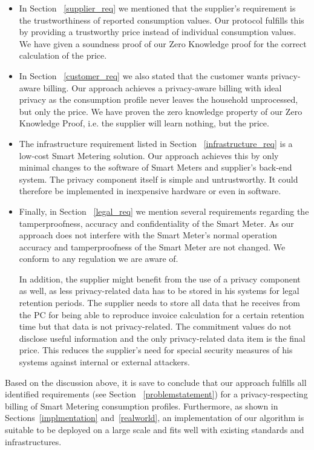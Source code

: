 \documentclass[english]{llncs}
\begin{document}
\begin{itemize}

\item In Section ~\ref{supplier_req} we mentioned that the supplier's requirement is the trustworthiness of reported consumption values.
Our protocol fulfills this by providing a trustworthy price instead of individual consumption values. 
We have given a soundness proof of our Zero Knowledge proof for the correct calculation of the price.

\item In Section ~\ref{customer_req} we also stated that the customer wants privacy-aware billing.
Our approach achieves a privacy-aware billing with ideal privacy as the consumption profile never leaves the household unprocessed, but only the price.
We have proven the zero knowledge property of our Zero Knowledge Proof, i.e. the supplier will learn nothing, but the price.

\item The infrastructure requirement listed in Section ~\ref{infrastructure_req} is a low-cost Smart Metering solution.
Our approach achieves this by only minimal changes to the software of Smart Meters and supplier's back-end system.
The privacy component itself is simple and untrustworthy.
It could therefore be implemented in inexpensive hardware or even in software.

\item  Finally, in Section ~\ref{legal_req} we mention several requirements regarding the tamperproofness, accuracy and confidentiality of the Smart Meter. As our approach does not interfere with the Smart Meter's normal operation accuracy and tamperproofness of the Smart Meter are not changed.
We conform to any regulation we are aware of.

In addition, the supplier might benefit from the use of a privacy component as well, as less privacy-related data has to be stored in his systems for legal retention periods. The supplier needs to store all data that he receives from the PC for being able to reproduce invoice calculation for a certain retention time but that data is not privacy-related. The commitment values do not disclose useful information and the only privacy-related data item is the final price. This reduces the supplier's need for special security measures of his systems against internal or external attackers.
\end{itemize}
Based on the discussion above, it is save to
conclude that our approach fulfills all identified requirements (see Section ~\ref{problemstatement}) for a privacy-respecting billing of Smart Metering consumption profiles. Furthermore, as shown in Sections~\ref{implmentation} and~\ref{realworld}, an implementation of our algorithm is suitable to be deployed on a large scale and fits well with existing standards and infrastructures. 
\end{document}
